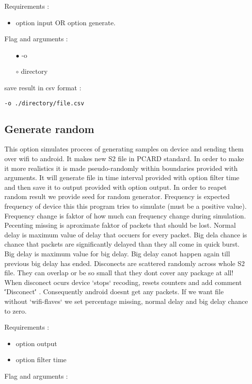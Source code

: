 \documentclass[english]{article}
\begin{document}
\noindent Requirements : 
\begin{itemize}
\item option input OR option generate. 
\end{itemize}
Flag and arguments :
\begin{itemize}
\item[$\bullet$] -o
\item[$\circ$] directory
\end{itemize}
save result in csv format : 
\begin{lstlisting} 
-o ./directory/file.csv
\end{lstlisting}


\subsection{Generate random}
This option simulates procces of generating samples on device and sending them over wifi to android. It makes new S2 file in PCARD standard. In order to make it more realistics it is made pseudo-randomly within boundaries provided with arguments. It will generate file in time interval provided with option filter time and then save it to output provided with option output. In order to reapet random result we provide seed for random generator. Frequency is expected frequency of device this this program tries to simulate (must be a positive value). Frequency change is faktor of how much can frequency change during simulation. Pecenting missing is aproximate faktor of packets that should be lost. Normal delay is maximum value of delay that occuers for every packet. Big dela chance is chance that packets are significantly delayed than they all come in quick burst. Big delay is maximum value for big delay. Big delay canot happen again till previous big delay has ended. Disconects are scattered randomly across whole S2 file. They can overlap or be so small that they dont cover any package at all! When disconect ocurs device `stops` recoding, resets counters and add comment \''Disconect\'' . Consequently android doesnt get any packets. If we want file without `wifi-flaves` we set percentage missing, normal delay and big delay chance to zero. 

\noindent Requirements : 
\begin{itemize}
\item option output
\item option filter time
\end{itemize}
Flag and arguments :
\end{document}
